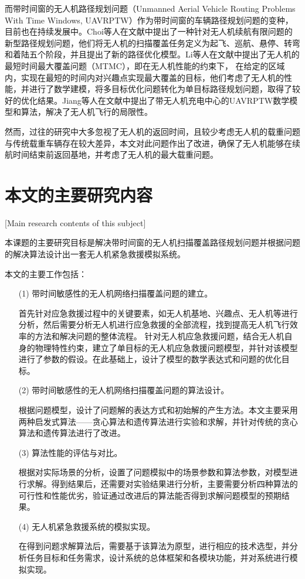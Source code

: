 而带时间窗的无人机路径规划问题（Unmanned Aerial Vehicle Routing Problems With Time Windows, UAVRPTW）作为带时间窗的车辆路径规划问题的变种，目前也在持续发展中。Choi等人在文献中提出了一种针对无人机续航有限问题的新型路径规划问题，他们将无人机的扫描覆盖任务定义为起飞、巡航、悬停、转弯和着陆五个阶段，并且提出了新的路径优化模型。Li等人在文献中提出了无人机的最短时间最大覆盖问题（MTMC），即在无人机性能的约束下，
在给定的区域内，实现在最短的时间内对兴趣点实现最大覆盖的目标，他们考虑了无人机的性能，并进行了数学建模，将多目标优化问题转化为单目标路径规划问题，取得了较好的优化结果。Jiang等人在文献中提出了带无人机充电中心的UAVRPTW数学模型和算法，解决了无人机飞行的局限性。


然而，过往的研究中大多忽视了无人机的返回时间，且较少考虑无人机的载重问题与传统载重车辆存在较大差异，本文对此问题作出了改进，确保了无人机能够在续航时间结束前返回基地，并考虑了无人机的最大载重问题。
\section{本文的主要研究内容}[Main research contents of this subject]

本课题的主要研究目标是解决带时间窗的无人机扫描覆盖路径规划问题并根据问题的解决算法设计出一套无人机紧急救援模拟系统。

本文的主要工作包括：
\begin{itemize}
  \item [(1)] 
  带时间敏感性的无人机网络扫描覆盖问题的建立。


  首先针对应急救援过程中的关键要素，如无人机基地、兴趣点、无人机等进行分析，然后需要分析无人机进行应急救援的全部流程，找到提高无人机飞行效率的方法和解决问题的整体流程。
  针对无人机应急救援问题，结合无人机自身的物理特性约束，建立了单目标的无人机应急救援问题模型，并针对该模型进行了参数的假设。在此基础上，设计了模型的数学表达式和问题的优化目标。
  \item [(2)]
  带时间敏感性的无人机网络扫描覆盖问题的算法设计。


  根据问题模型，设计了问题解的表达方式和初始解的产生方法。本文主要采用两种启发式算法——贪心算法和遗传算法进行实验和求解，并针对传统的贪心算法和遗传算法进行了改进。
  \item [(3)]
  算法性能的评估与对比。


  根据对实际场景的分析，设置了问题模拟中的场景参数和算法参数，对模型进行求解。得到结果后，还需要对实验结果进行分析，主要需要分析四种算法的可行性和性能优劣，验证通过改进后的算法能否得到求解问题模型的预期结果。
  \item [(4)]
  无人机紧急救援系统的模拟实现。


  在得到问题求解算法后，需要基于该算法为原型，进行相应的技术选型，并分析任务目标和任务需求，设计系统的总体框架和各模块功能，并对系统进行模拟实现。
\end{itemize}